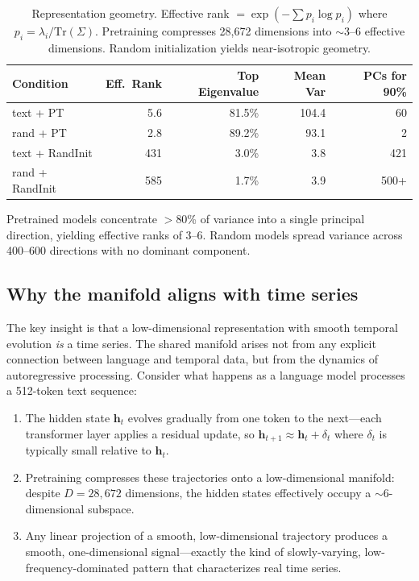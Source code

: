 \documentclass[11pt,a4paper]{article}
\begin{document}
\begin{table}[h]
\centering
\begin{tabular}{lrrrr}
\toprule
Condition & Eff.\ Rank & Top Eigenvalue & Mean Var & PCs for 90\% \\
\midrule
text + PT & 5.6 & 81.5\% & 104.4 & 60 \\
rand + PT & 2.8 & 89.2\% & 93.1 & 2 \\
text + RandInit & 431 & 3.0\% & 3.8 & 421 \\
rand + RandInit & 585 & 1.7\% & 3.9 & 500+ \\
\bottomrule
\end{tabular}
\caption{Representation geometry. Effective rank $= \exp(-\sum p_i \log p_i)$ where $p_i = \lambda_i / \mathrm{Tr}(\Sigma)$. Pretraining compresses 28{,}672 dimensions into $\sim$3--6 effective dimensions. Random initialization yields near-isotropic geometry.}
\label{tab:pca}
\end{table}

Pretrained models concentrate $>$80\% of variance into a single principal direction, yielding effective ranks of 3--6. Random models spread variance across 400--600 directions with no dominant component.

\subsection{Why the manifold aligns with time series}

The key insight is that a low-dimensional representation with smooth temporal evolution \textit{is} a time series. The shared manifold arises not from any explicit connection between language and temporal data, but from the dynamics of autoregressive processing. Consider what happens as a language model processes a 512-token text sequence:

\begin{enumerate}[nosep]
    \item The hidden state $\mathbf{h}_t$ evolves gradually from one token to the next---each transformer layer applies a residual update, so $\mathbf{h}_{t+1} \approx \mathbf{h}_t + \delta_t$ where $\delta_t$ is typically small relative to $\mathbf{h}_t$.
    \item Pretraining compresses these trajectories onto a low-dimensional manifold: despite $D = 28{,}672$ dimensions, the hidden states effectively occupy a $\sim$6-dimensional subspace.
    \item Any linear projection of a smooth, low-dimensional trajectory produces a smooth, one-dimensional signal---exactly the kind of slowly-varying, low-frequency-dominated pattern that characterizes real time series.
\end{enumerate}
\end{document}
